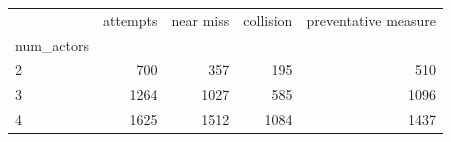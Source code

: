 \begin{tabular}{lrrrr}
\toprule
 & attempts & near miss & collision & preventative measure \\
num_actors &  &  &  &  \\
\midrule
2 & 700 & 357 & 195 & 510 \\
3 & 1264 & 1027 & 585 & 1096 \\
4 & 1625 & 1512 & 1084 & 1437 \\
\bottomrule
\end{tabular}
